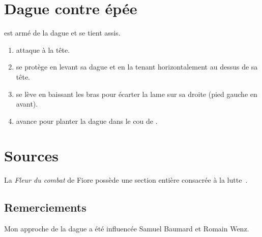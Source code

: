 \section{Dague contre épée}


\begin{technique}

\D est armé de la dague et se tient assis.

\begin{enumerate}
	\item \A attaque à la tête.
	
	\item \D se protège en levant sa dague et en la tenant horizontalement au dessus de sa tête.
	
	\item \D se lève en baissant les bras pour écarter la lame sur sa droite (pied gauche en avant).
	
	\item \D avance pour planter la dague dans le cou de \D.
\end{enumerate}

\end{technique}


\section{Sources}


La \emph{Fleur du combat} de Fiore possède une section entière consacrée à la lutte~\cite{deiLiberi:Conan:2014:FleurCombat:Dague}.


\subsection*{Remerciements}


Mon approche de la dague a été influencée Samuel Baumard et Romain Wenz.
